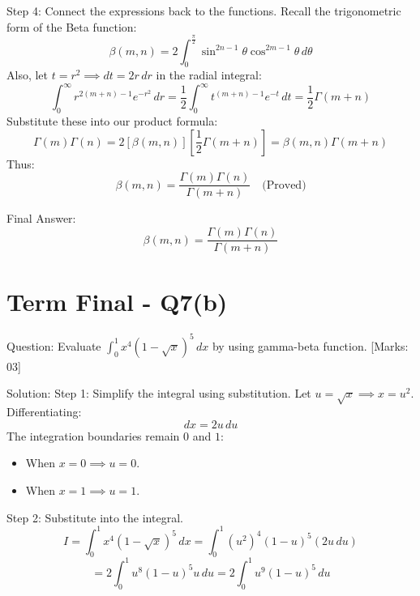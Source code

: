 \documentclass[11pt, a4paper]{article}
\begin{document}
Step 4: Connect the expressions back to the functions.
Recall the trigonometric form of the Beta function:
\[
\beta(m, n) = 2 \int_{0}^{\frac{\pi}{2}} \sin^{2n-1}\theta \cos^{2m-1}\theta \, d\theta
\]
Also, let $t = r^2 \implies dt = 2r \, dr$ in the radial integral:
\[
\int_{0}^{\infty} r^{2(m+n)-1} e^{-r^2} \, dr = \frac{1}{2} \int_{0}^{\infty} t^{(m+n)-1} e^{-t} \, dt = \frac{1}{2} \Gamma(m+n)
\]
Substitute these into our product formula:
\[
\Gamma(m)\Gamma(n) = 2 \left[ \beta(m, n) \right] \left[ \frac{1}{2} \Gamma(m+n) \right] = \beta(m, n) \Gamma(m+n)
\]
Thus:
\[
\beta(m, n) = \frac{\Gamma(m)\Gamma(n)}{\Gamma(m+n)} \quad \text{(Proved)}
\]

Final Answer:
\[
\boxed{\beta(m, n) = \frac{\Gamma(m)\Gamma(n)}{\Gamma(m+n)}}
\]





\section*{Term Final - Q7(b)}

Question:
Evaluate $\int_{0}^{1} x^4 (1 - \sqrt{x})^5 \, dx$ by using gamma-beta function. [Marks: 03]

Solution:
Step 1: Simplify the integral using substitution.
Let $u = \sqrt{x} \implies x = u^2$.
Differentiating:
\[
dx = 2u \, du
\]
The integration boundaries remain $0$ and $1$:
\begin{itemize}
    \item When $x = 0 \implies u = 0$.
    \item When $x = 1 \implies u = 1$.
\end{itemize}

Step 2: Substitute into the integral.
\[
I = \int_{0}^{1} x^4 (1 - \sqrt{x})^5 \, dx = \int_{0}^{1} (u^2)^4 (1 - u)^5 (2u \, du)
\]
\[
= 2 \int_{0}^{1} u^8 (1 - u)^5 u \, du = 2 \int_{0}^{1} u^9 (1 - u)^5 \, du
\]
\end{document}
